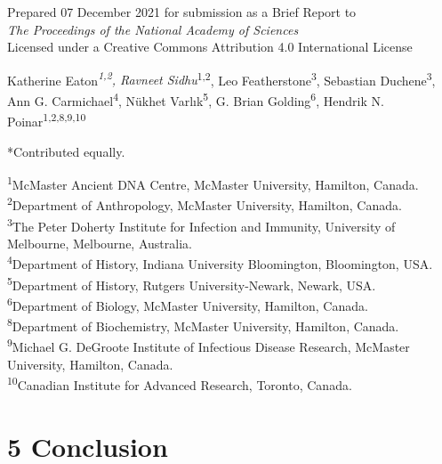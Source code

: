 \documentclass[
]{report}
\begin{document}
\setlength{\parindent}{0em}

Prepared 07 December 2021 for submission as a Brief Report to\\
\emph{The Proceedings of the National Academy of Sciences}\\
Licensed under a Creative Commons Attribution 4.0 International
License\\
\hspace*{0.333em}

Katherine Eaton\emph{\textsuperscript{1,2}, Ravneet
Sidhu}\textsuperscript{1,2}, Leo Featherstone\textsuperscript{3},
Sebastian Duchene\textsuperscript{3}, Ann G.
Carmichael\textsuperscript{4}, Nükhet Varlık\textsuperscript{5}, G.
Brian Golding\textsuperscript{6}, Hendrik N.
Poinar\textsuperscript{1,2,8,9,10}\\
\hspace*{0.333em}

*Contributed equally.

\textsuperscript{1}McMaster Ancient DNA Centre, McMaster University,
Hamilton, Canada.\\
\textsuperscript{2}Department of Anthropology, McMaster University,
Hamilton, Canada.\\
\textsuperscript{3}The Peter Doherty Institute for Infection and
Immunity, University of Melbourne, Melbourne, Australia.\\
\textsuperscript{4}Department of History, Indiana University
Bloomington, Bloomington, USA.\\
\textsuperscript{5}Department of History, Rutgers University-Newark,
Newark, USA.\\
\textsuperscript{6}Department of Biology, McMaster University, Hamilton,
Canada.\\
\textsuperscript{8}Department of Biochemistry, McMaster University,
Hamilton, Canada.\\
\textsuperscript{9}Michael G. DeGroote Institute of Infectious Disease
Research, McMaster University, Hamilton, Canada.\\
\textsuperscript{10}Canadian Institute for Advanced Research, Toronto,
Canada.\\
\hspace*{0.333em}

\setlength{\parindent}{2em}

\hypertarget{conclusion}{%
\chapter{5 Conclusion}\label{conclusion}}
\end{document}
